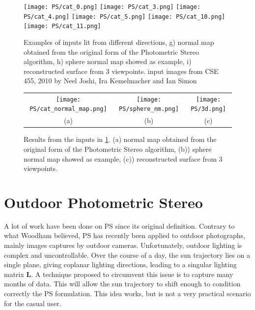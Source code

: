 \begin{figure}
\centering
\texttt{[image: PS/cat\_0.png]}
\texttt{[image: PS/cat\_3.png]}
\texttt{[image: PS/cat\_4.png]}
\texttt{[image: PS/cat\_5.png]}
\texttt{[image: PS/cat\_10.png]}
\texttt{[image: PS/cat\_11.png]}
\caption{Examples of inputs lit from different directions, g) normal map obtained from the original form of the Photometric Stereo algorithm, h) sphere normal map showed as example, i) reconstructed surface from 3 viewpoints.\newline
{\small input images from CSE 455, 2010 by Neel Joshi, Ira Kemelmacher and Ian Simon}
}
\label{fig:PS_example}
\end{figure}

\begin{figure}
\begin{tabular}{ccc}
\texttt{[image: PS/cat\_normal\_map.png]} &
\texttt{[image: PS/sphere\_nm.png]} &
\texttt{[image: PS/3d.png]} \\
(a) & (b) & (c)
\end{tabular}
\caption{Results from the inputs in \ref{fig:PS_example}. (a) normal map obtained from the original form of the Photometric Stereo algorithm, (b)) sphere normal map showed as example, (c)) reconstructed surface from 3 viewpoints.}
\label{fig:PS_example_res}
\end{figure}

\section{Outdoor Photometric Stereo}

A lot of work have been done on PS since its original definition. Contrary to what Woodham believed, PS has recently been applied to outdoor photographs, mainly images captures by outdoor cameras. Unfortunately, outdoor lighting is complex and uncontrollable. Over the course of a day, the sun trajectory lies on a single plane, giving coplanar lighting directions, leading to a singular lighting matrix $\mathbf{L}$. A technique proposed to circumvent this issue is to capture many months of data. This will allow the sun trajectory to shift enough to condition correctly the PS formulation. This idea works, but is not a very practical scenario for the casual user.

